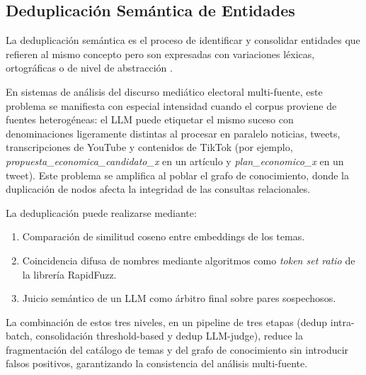 \subsection{Deduplicación Semántica de Entidades}

La deduplicación semántica es el proceso de identificar y consolidar entidades que refieren al mismo concepto pero son expresadas con variaciones léxicas, ortográficas o de nivel de abstracción \parencite{tec_mudgal2018deepmatcher}.

En sistemas de análisis del discurso mediático electoral multi-fuente, este problema se manifiesta con especial intensidad cuando el corpus proviene de fuentes heterogéneas: el LLM puede etiquetar el mismo suceso con denominaciones ligeramente distintas al procesar en paralelo noticias, tweets, transcripciones de YouTube y contenidos de TikTok (por ejemplo, \textit{propuesta\_economica\_candidato\_x} en un artículo y \textit{plan\_economico\_x} en un tweet). Este problema se amplifica al poblar el grafo de conocimiento, donde la duplicación de nodos afecta la integridad de las consultas relacionales.

La deduplicación puede realizarse mediante:
\begin{enumerate}
    \item Comparación de similitud coseno entre embeddings de los temas.
    \item Coincidencia difusa de nombres mediante algoritmos como \textit{token set ratio} de la librería RapidFuzz.
    \item Juicio semántico de un LLM como árbitro final sobre pares sospechosos.
\end{enumerate}

La combinación de estos tres niveles, en un pipeline de tres etapas (dedup intra-batch, consolidación threshold-based y dedup LLM-judge), reduce la fragmentación del catálogo de temas y del grafo de conocimiento sin introducir falsos positivos, garantizando la consistencia del análisis multi-fuente.